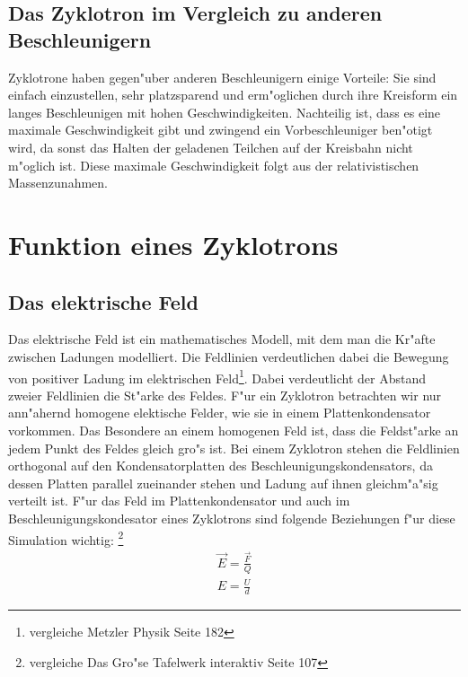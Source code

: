 \documentclass[14pt, a4paper]{report}
\begin{document}
\section{Das Zyklotron im Vergleich zu anderen Beschleunigern}
Zyklotrone haben gegen"uber anderen Beschleunigern einige Vorteile: Sie sind einfach
einzustellen, sehr  platzsparend und erm"oglichen durch ihre Kreisform  ein langes
Beschleunigen mit hohen Geschwindigkeiten. Nachteilig ist, dass es eine maximale
Geschwindigkeit gibt und zwingend ein Vorbeschleuniger ben"otigt wird, da sonst das 
Halten der geladenen Teilchen auf der Kreisbahn nicht m"oglich ist. Diese maximale
Geschwindigkeit folgt aus der relativistischen Massenzunahmen.

\chapter{Funktion eines Zyklotrons}
\section{Das elektrische Feld}
Das elektrische Feld ist ein mathematisches Modell, 
mit dem man die Kr"afte zwischen
Ladungen modelliert. Die Feldlinien verdeutlichen dabei die Bewegung von positiver 
Ladung im elektrischen Feld\footnote{vergleiche Metzler Physik Seite 182}.
Dabei verdeutlicht der Abstand zweier
Feldlinien die St"arke des Feldes. F"ur ein Zyklotron betrachten wir nur ann"ahernd
homogene elektische Felder, wie sie in einem Plattenkondensator vorkommen. Das Besondere an 
einem homogenen Feld ist, dass die Feldst"arke an jedem Punkt des Feldes gleich gro"s
ist. Bei einem Zyklotron stehen die Feldlinien orthogonal auf den Kondensatorplatten
des Beschleunigungskondensators, da dessen Platten parallel zueinander stehen und Ladung
auf ihnen gleichm"a"sig verteilt ist.
F"ur das Feld im Plattenkondensator und auch im Beschleunigungskondesator eines Zyklotrons
sind folgende Beziehungen f"ur diese Simulation wichtig:
\footnote{vergleiche Das Gro"se Tafelwerk interaktiv Seite 107}
\begin{eqnarray} \label{E-Feld-Gleichungen}
\vec{E} = \frac{\vec{F}}{Q} \\
E = \frac{U}{d}
\end{eqnarray}
\end{document}
